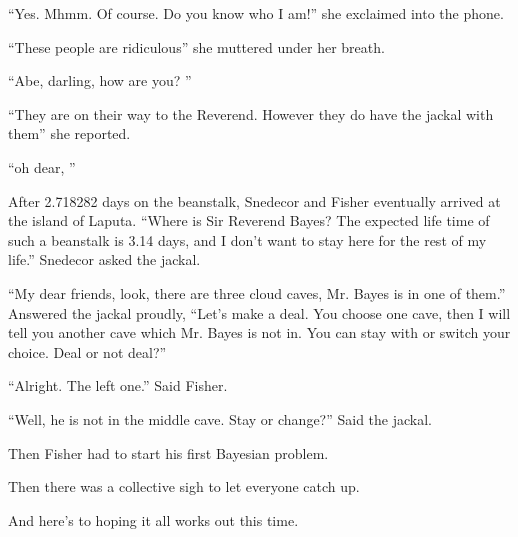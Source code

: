 \documentclass{article}
\begin{document}
``Yes. Mhmm. Of course. Do you know who I am!'' she exclaimed into the phone. 

``These people are ridiculous'' she muttered under her breath. 

``Abe, darling, how are you? ''

``They are on their way to the Reverend. However they do have the jackal with them'' she reported.

``oh dear, ''



After 2.718282 days on the beanstalk, Snedecor and Fisher eventually arrived at the island of Laputa. 
``Where is Sir Reverend Bayes? The expected life time of such a beanstalk is 3.14 days, 
and I don't want to stay here for the rest of my life.'' Snedecor asked the jackal.

``My dear friends, look, there are three cloud caves, Mr. Bayes is in one of them.'' Answered the jackal proudly,
``Let's make a deal. You choose one cave, then I will tell you another cave which Mr. Bayes is not in.
You can stay with or switch your choice. Deal or not deal?''

``Alright. The left one.'' Said Fisher.

``Well, he is not in the middle cave. Stay or change?'' Said the jackal.

Then Fisher had to start his first Bayesian problem.




Then there was a collective sigh to let everyone catch up.



And here's to hoping it all works out this time.
\end{document}
